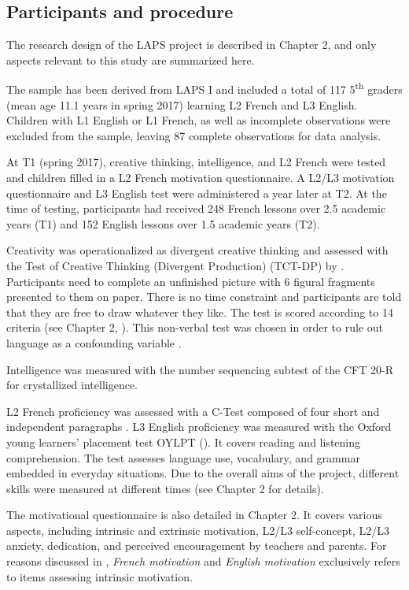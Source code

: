 \documentclass[output=paper]{langsci/langscibook}
\begin{document}
\subsection{Participants and procedure}

The research design of the LAPS project is described in Chapter 2, and only aspects relevant to this study are summarized here.

The sample has been derived from LAPS I and included a total of 117 5\textsuperscript{th} graders (mean age 11.1 years in spring 2017) learning L2 French and L3 English. Children with L1 English or L1 French, as well as incomplete observations were excluded from the sample, leaving 87 complete observations for data analysis.

At T1 (spring 2017), creative thinking, intelligence, and L2 French were tested and children filled in a L2 French motivation questionnaire. A L2/L3 motivation questionnaire and L3 English test were administered a year later at T2. At the time of testing, participants had received 248 French lessons over 2.5 academic years (T1) and 152 English lessons over 1.5 academic years (T2). 

Creativity was operationalized as divergent creative thinking and assessed with the Test of Creative Thinking (Divergent Production) (TCT-DP) by \citet{UrbanJellen1995}. Participants need to complete an unfinished picture with 6 figural fragments presented to them on paper. There is no time constraint and participants are told that they are free to draw whatever they like. The test is scored according to 14 criteria (see Chapter 2, ). This non-verbal test was chosen in order to rule out language as a confounding variable \citep{Simonton2008}.

Intelligence was measured with the number sequencing subtest of the CFT 20-R \citep{Weiss2006} for crystallized intelligence. 

L2 French proficiency was assessed with a C-Test composed of four short and independent paragraphs \citep{Grotjahn2002}. L3 English proficiency was measured with the Oxford young learners’ placement test OYLPT (\citealt{Testing2013}). It covers reading and listening comprehension. The test assesses language use, vocabulary, and grammar embedded in everyday situations. Due to the overall aims of the project, different skills were measured at different times (see Chapter 2 for details).

The motivational questionnaire is also detailed in Chapter 2. It covers various aspects, including intrinsic and extrinsic motivation, L2/L3 self-concept, L2/L3 anxiety, dedication, and perceived encouragement by teachers and parents. For reasons discussed in , \textit{French motivation} and \textit{English motivation} exclusively refers to items assessing intrinsic motivation. 
\end{document}

